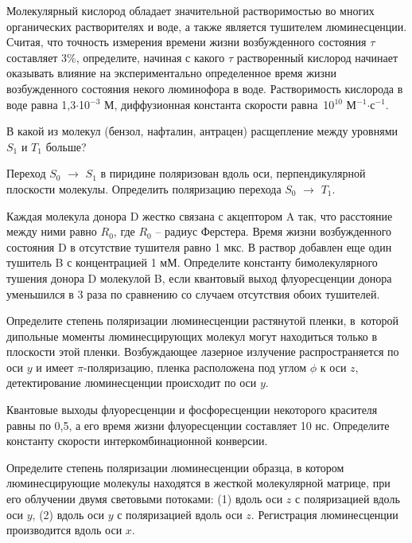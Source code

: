  Молекулярный кислород обладает значительной растворимостью во многих органических растворителях и воде, а также является тушителем люминесценции. Считая, что точность измерения времени жизни возбужденного состояния $\tau$ составляет 3\%, определите, начиная с какого $\tau$ растворенный кислород начинает оказывать влияние на экспериментально определенное время жизни возбужденного состояния некого люминофора в воде. Растворимость кислорода в воде равна 1,3$\cdot$10$^{-3}$ М, диффузионная константа скорости равна~10$^{10}$ М$^{-1}$$\cdot$с$^{-1}$.
\par
{} В какой из молекул (бензол, нафталин, антрацен) расщепление между уровнями $S_1$ и $T_1$ больше?
\par
{} Переход $S_0$ $\rightarrow$ $S_1$ в пиридине поляризован вдоль оси, перпендикулярной плоскости молекулы. Определить поляризацию перехода $S_0$ $\rightarrow$ $T_1$.
\par
{} Каждая молекула донора D жестко связана с акцептором A так, что расстояние между ними равно $R_0$, где $R_0$ – радиус Ферстера. Время жизни возбужденного состояния D в отсутствие тушителя равно 1 мкс. В раствор добавлен еще один тушитель B с концентрацией 1 мМ. Определите константу бимолекулярного тушения донора D молекулой B, если квантовый выход флуоресценции донора уменьшился в 3 раза по сравнению со случаем отсутствия обоих тушителей.
\par
{} Определите степень поляризации люминесценции растянутой пленки, в~которой дипольные моменты люминесцирующих молекул могут находиться только в плоскости этой пленки. Возбуждающее лазерное излучение распространяется по оси $y$ и имеет $\pi$-поляризацию, пленка расположена под углом $\phi$ к оси $z$, детектирование люминесценции происходит по оси $y$.
\par
{} Квантовые выходы флуоресценции и фосфоресценции некоторого красителя равны по 0,5, а его время жизни флуоресценции составляет 10 нс. Определите константу скорости интеркомбинационной конверсии.
\par
{} Определите степень поляризации люминесценции образца, в котором люминесцирующие молекулы находятся в жесткой молекулярной матрице, при его облучении двумя световыми потоками: (1) вдоль оси $z$ с поляризацией вдоль оси $y$, (2) вдоль оси $y$ с поляризацией вдоль оси $z$. Регистрация люминесценции производится вдоль оси $x$.
\par
\begin{figure} %

\end{figure}$$
